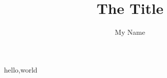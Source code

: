 \documentclass{article}
\author{My Name}
\title{The Title}
\begin{document}
    \maketitle
    hello,world %
\end{document}
